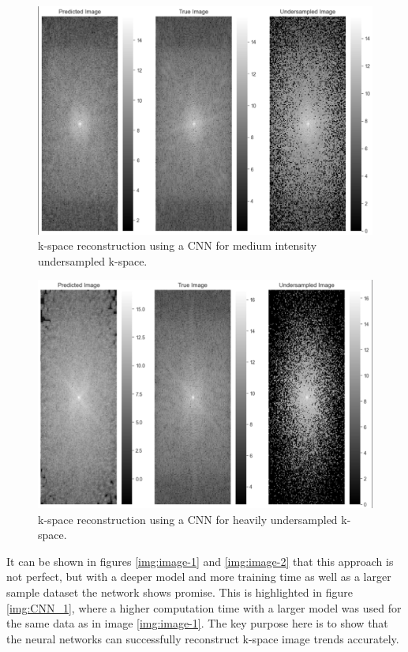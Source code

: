 \documentclass[14pt]{extreport}
\begin{document}
        \begin{figure}[h]
            \centering
            \includegraphics[width=0.75\linewidth]{CNN_1_kspace.png}
            \caption{k-space reconstruction using a CNN for medium intensity undersampled k-space.}
            \label{img:kspace-1}
        \end{figure}

        \begin{figure}[h]
            \centering
            \includegraphics[width=0.75\linewidth]{Kspace-2.png}
            \caption{k-space reconstruction using a CNN for heavily undersampled k-space.}
            \label{img:kspace-2}
        \end{figure}

        It can be shown in figures \ref{img:image-1} and \ref{img:image-2} that this approach is not perfect, but with a deeper model and more training time as well as a larger sample dataset the network shows promise. This is highlighted in figure \ref{img:CNN_1}, where a higher computation time with a larger model was used for the same data as in image \ref{img:image-1}. The key purpose here is to show that the neural networks can successfully reconstruct k-space image trends accurately.
\end{document}
